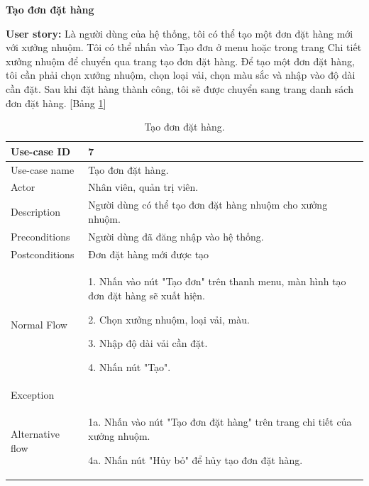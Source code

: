 \textbf{Tạo đơn đặt hàng}\par
\textbf{User story:} Là người dùng của hệ thống, tôi có thể tạo một đơn đặt hàng mới với xưởng nhuộm. Tôi có thể nhấn vào Tạo đơn ở menu hoặc trong trang Chi tiết xưởng nhuộm để chuyển qua trang tạo đơn đặt hàng. Để tạo một đơn đặt hàng, tôi cần phải chọn xưởng nhuộm, chọn loại vải, chọn màu sắc và nhập vào độ dài cần đặt. Sau khi đặt hàng thành công, tôi sẽ được chuyển sang trang danh sách đơn đặt hàng. [Bảng \ref{bang7}]
\begin{table}[H]
    \centering
    \begin{tabular}{|m{3cm}|m{10cm}|}
    \hline 
        Use-case ID & 7\\ \hline
        Use-case name & Tạo đơn đặt hàng.\\ \hline
        Actor & Nhân viên, quản trị viên.\\ \hline
        Description & Người dùng có thể tạo đơn đặt hàng nhuộm cho xưởng nhuộm.\\ \hline
        Preconditions & Người dùng đã đăng nhập vào hệ thống.\\ \hline
        Postconditions & Đơn đặt hàng mới được tạo\\ \hline
        Normal Flow & 
        1. Nhấn vào nút "Tạo đơn" trên thanh menu, màn hình tạo đơn đặt hàng sẽ xuất hiện.\par
        2. Chọn xưởng nhuộm, loại vải, màu.\par
        3. Nhập độ dài vải cần đặt.\par
        4. Nhấn nút "Tạo".
        \\ \hline
        Exception & \\ \hline
        Alternative flow & 
        1a. Nhấn vào nút "Tạo đơn đặt hàng" trên trang chi tiết của xưởng nhuộm.\par
        4a. Nhấn nút "Hủy bỏ" để hủy tạo đơn đặt hàng.
        \\ 
    \hline 
    \end{tabular}
    \caption{Tạo đơn đặt hàng.}
    \label{bang7}
\end{table}


